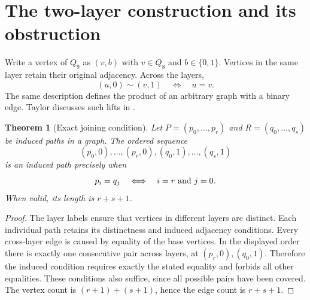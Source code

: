 \documentclass[11pt,a4paper]{article}
\newtheorem{theorem}{Theorem}[section]
\theoremstyle{definition}
\theoremstyle{remark}
\newcommand{\Q}{Q}
\begin{document}
\section{The two-layer construction and its obstruction}
Write a vertex of $\Q_9$ as $(v,b)$ with $v\in\Q_8$ and $b\in\{0,1\}$. Vertices in the same layer retain their original adjacency. Across the layers,
\[
(u,0)\sim(v,1)\quad\Longleftrightarrow\quad u=v.
\]
The same description defines the product of an arbitrary graph with a binary edge. Taylor discusses such lifts in \cite{taylor}.

\begin{theorem}[Exact joining condition]\label{thm:join}
Let $P=(p_0,\ldots,p_r)$ and $R=(q_0,\ldots,q_s)$ be induced paths in a graph. The ordered sequence
\[
(p_0,0),\ldots,(p_r,0),(q_0,1),\ldots,(q_s,1)
\]
is an induced path precisely when
\[
p_i=q_j\quad\Longleftrightarrow\quad i=r\ \hbox{and}\ j=0.
\]
When valid, its length is $r+s+1$.
\end{theorem}
\begin{proof}
The layer labels ensure that vertices in different layers are distinct. Each individual path retains its distinctness and induced adjacency conditions. Every cross-layer edge is caused by equality of the base vertices. In the displayed order there is exactly one consecutive pair across layers, at $(p_r,0),(q_0,1)$. Therefore the induced condition requires exactly the stated equality and forbids all other equalities. These conditions also suffice, since all possible pairs have been covered. The vertex count is $(r+1)+(s+1)$, hence the edge count is $r+s+1$.
\end{proof}
\end{document}
